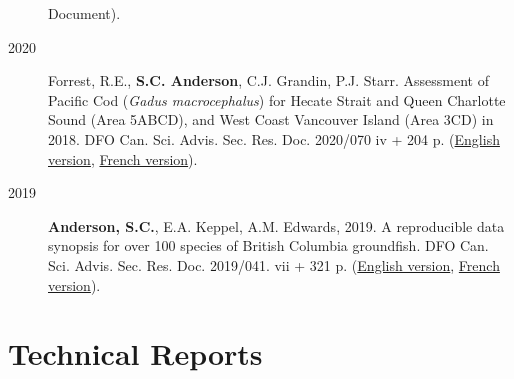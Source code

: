\begin{description}
{Document}).
\item[2020]
Forrest, R.E., \textbf{S.C. Anderson}, C.J. Grandin, P.J. Starr.
Assessment of Pacific Cod (\emph{Gadus macrocephalus}) for Hecate Strait
and Queen Charlotte Sound (Area 5ABCD), and West Coast Vancouver Island
(Area 3CD) in 2018. DFO Can. Sci. Advis. Sec. Res. Doc. 2020/070 iv +
204 p.
(\href{https://www.dfo-mpo.gc.ca/csas-sccs/Publications/ResDocs-DocRech/2020/2020_070-eng.html}{English
version},
\href{https://www.dfo-mpo.gc.ca/csas-sccs/Publications/ResDocs-DocRech/2020/2020_070-fra.html}{French
version}).
\item[2019]
\textbf{Anderson, S.C.}, E.A. Keppel, A.M. Edwards, 2019. A reproducible
data synopsis for over 100 species of British Columbia groundfish. DFO
Can. Sci. Advis. Sec. Res. Doc. 2019/041. vii + 321 p.
(\href{http://www.dfo-mpo.gc.ca/csas-sccs/Publications/ResDocs-DocRech/2019/2019_041-eng.html}{English
version},
\href{http://www.dfo-mpo.gc.ca/csas-sccs/Publications/ResDocs-DocRech/2019/2019_041-fra.html}{French
version}).
\end{description}

\section{Technical Reports}\label{technical-reports}

